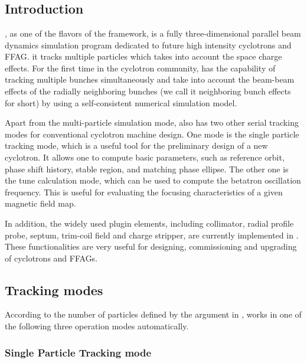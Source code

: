 

\chapter{\opalcycl}
\label{chp:opalcycl}


\section{Introduction}

\opalcycl, as one of the flavors of the \opal framework,  is a fully three-dimensional parallel beam dynamics simulation program dedicated to future high intensity cyclotrons and FFAG. it tracks multiple particles  which takes into account the space charge effects. For the first time in the cyclotron community, \opalcycl has the capability of tracking multiple bunches simultaneously
and take into account the beam-beam effects of the radially neighboring bunches (we call it neighboring bunch effects for short)
by using a self-consistent numerical simulation model.

Apart from the multi-particle simulation mode, \opalcycl also has two other serial tracking modes for conventional cyclotron machine design. One mode is the single particle tracking mode, which is a useful tool for the preliminary design of a new cyclotron.  It allows one to compute basic parameters, such as reference orbit, phase shift history, stable region, and matching phase ellipse. The other one is the tune calculation mode, which can be used to compute the betatron oscillation frequency.
This is useful for evaluating the focusing characteristics of a given magnetic field map.

In addition, the widely used plugin elements, including collimator, radial profile probe, septum, trim-coil field and charge stripper,  are currently implemented in \opalcycl. These functionalities are very useful for designing, commissioning and upgrading of cyclotrons and FFAGs.

\section{Tracking modes}
According to the number of particles defined by the argument  in   ,
\opalcycl  works in one of the following three operation modes automatically.


\subsection{Single Particle Tracking mode}


